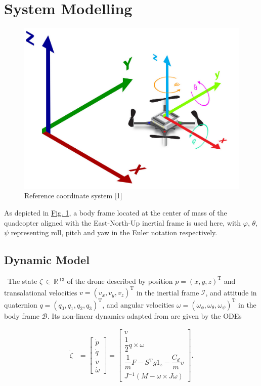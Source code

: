\documentclass[conference]{IEEEtran}
\begin{document}
\section{System Modelling}\label{Section2}
\begin{figure}[htbp]
	\centerline{\includegraphics[scale = 0.4]{figures/ordinate.png} }
	\caption{Reference coordinate system [1]}
	\label{Fig1}
\end{figure}
As depicted in \hyperref[Fig1]{Fig. 1}, a body frame located at the center of mass of the quadcopter aligned with the East-North-Up inertial frame is used here, with $\varphi$, $\theta$, $\psi$ representing roll, pitch and yaw in the Euler notation respectively.

\subsection{Dynamic Model}\
The state ${\zeta\,\in\,\mathbb{R}\,\mathrm{^{13}}}$ of the drone described by position ${p = (x, y, z)^{\mathrm{T}}}$ and transalational velocities ${v = (v_x, v_y, v_z)^\mathrm{T}}$ in the inertial frame $\mathcal{I}$, and attitude in quaternion ${q = (q_{0}, q_{1}, q_{2}, q_{3})^{\mathrm{T}}}$, and angular velocities ${\omega = (\omega_{\phi}, \omega_{\theta}, \omega_{\psi})^{\mathrm{T}}}$ in the body frame $\mathcal{B}$. Its non-linear dynamics adapted from \cite{carlos_efficient_2020} are given by the ODEs 

\begin{align}
\dot{\zeta} &= \begin{bmatrix}
	\dot{p} \\
	\dot{q}\\
	\dot{v}\\
	\dot{\omega}
\end{bmatrix} =
\begin{bmatrix}
    v \\
    \dfrac{1}{2}q\times \omega\\
    \dfrac{1}{m}F - S\mathrm{^{T}}g1_z - \dfrac{C_d}{m} v\\ 
    J\mathrm{^{-1}}\left(M - \omega \times J \omega\right)
\end{bmatrix}.
\end{align}
\end{document}
